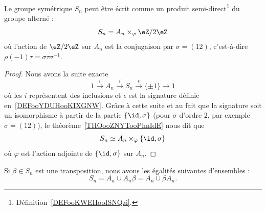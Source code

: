 \begin{proposition}      \label{PROPooPSZVooSmAgPA}
	Le groupe symétrique \( S_n\) peut être écrit comme un produit semi-direct\footnote{Définition~\ref{DEFooKWEHooISNQzi}.} du groupe alterné :
	\begin{equation}
		S_n=A_n\times_{\varphi}\eZ/2\eZ
	\end{equation}
	où l'action de \( \eZ/2\eZ\) sur \( A_n\) est la conjugaison par \( \sigma=(12)\), c'est-à-dire \( \rho(-1)\tau=\sigma\tau\sigma^{-1}\).
\end{proposition}

\begin{proof}
	Nous avons la suite exacte
	\begin{equation}
		1\stackrel{i}{\longrightarrow}A_n\stackrel{i}{\longrightarrow}S_n\stackrel{\epsilon}{\longrightarrow}\{ \pm 1 \}\longrightarrow 1
	\end{equation}
	où les \( i\) représentent des inclusions et \( \epsilon\) est la signature définie en~\ref{DEFooYDUHooKIXGNW}. Grâce à cette suite et au fait que la signature soit un isomorphisme à partir de la partie \( \{ \id,\sigma \}\) (pour \( \sigma\) d'ordre \( 2\), par exemple \( \sigma=(12)\)), le théorème~\ref{THOooZNYTooPhnIdE} nous dit que
	\begin{equation}
		S_n\simeq A_n\times_{\varphi}\{ \id,\sigma \}
	\end{equation}
	où \( \varphi\) est l'action adjointe de \( \{ \id,\sigma \}\) sur \( A_n\).
\end{proof}

\begin{proposition}     \label{PROPooZOWBooIMxxlj}
	Si \( \beta\in S_n\) est une transposition, nous avons les égalités suivantes d'ensembles :
	\begin{equation}
		S_n=A_n\cup A_n\beta=A_n\cup \beta A_n.
	\end{equation}
\end{proposition}

